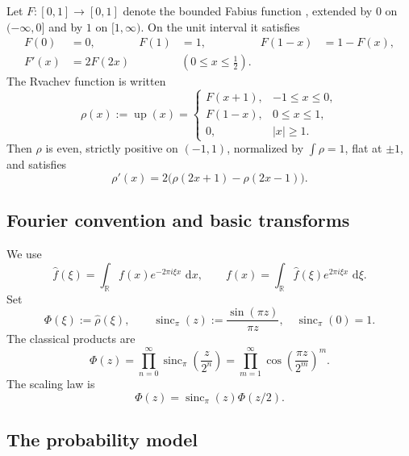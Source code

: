 \documentclass[11pt]{article}
\theoremstyle{definition}
\theoremstyle{remark}
\newcommand{\R}{\mathbb R}
\newcommand{\dd}{\,\mathrm d}
\newcommand{\Up}{\operatorname{up}}
\newcommand{\sincpi}{\operatorname{sinc}_{\pi}}
\begin{document}
Let \(F:[0,1]\to[0,1]\) denote the bounded Fabius function \cite{Fabius1966,AriasTranslation}, extended by \(0\) on
\(( -\infty,0]\) and by \(1\) on \([1,\infty)\).  On the unit interval it satisfies
\begin{align}
 F(0)&=0, & F(1)&=1, & F(1-x)&=1-F(x), \label{eq:F-symmetry}\\
 F'(x)&=2F(2x) &&(0\le x\le\tfrac12). \label{eq:F-diff}
\end{align}
The Rvachev function is written
\begin{equation}
 \rho(x):=\Up(x)=
 \begin{cases}
 F(x+1),&-1\le x\le0,\\
 F(1-x),&0\le x\le1,\\
 0,&|x|\ge1.
 \end{cases}                                                \label{eq:rho-fold}
\end{equation}
Then \(\rho\) is even, strictly positive on \((-1,1)\), normalized by
\(\int\rho=1\), flat at \(\pm1\), and satisfies
\begin{equation}
 \rho'(x)=2\bigl(\rho(2x+1)-\rho(2x-1)\bigr).                \label{eq:rho-dde}
\end{equation}

\subsection{Fourier convention and basic transforms}

We use
\begin{equation}
 \widehat f(\xi)=\int_{\R}f(x)e^{-2\pi i\xi x}\,\dd x,
 \qquad
 f(x)=\int_{\R}\widehat f(\xi)e^{2\pi i\xi x}\,\dd\xi.       \label{eq:fourier-convention}
\end{equation}
Set
\begin{equation}
 \Phi(\xi):=\widehat\rho(\xi),
 \qquad
 \sincpi(z):=\frac{\sin(\pi z)}{\pi z},\quad \sincpi(0)=1. \label{eq:Phi-def}
\end{equation}
The classical products are
\begin{equation}
 \Phi(z)=\prod_{n=0}^{\infty}\sincpi\!\left(\frac{z}{2^n}\right)
 =\prod_{m=1}^{\infty}\cos\!\left(\frac{\pi z}{2^m}\right)^m. \label{eq:Phi-products}
\end{equation}
The scaling law is
\begin{equation}
 \Phi(z)=\sincpi(z)\Phi(z/2).                                \label{eq:Phi-scaling}
\end{equation}

\subsection{The probability model}
\end{document}
